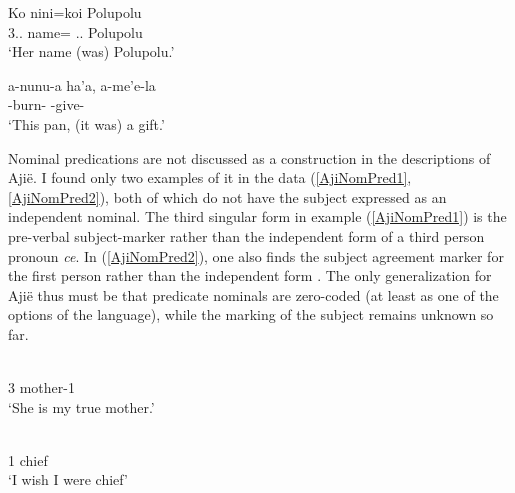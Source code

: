 \begin{exe}\ex\label{SavoNomPredZeroS}
\gll Ko nini=koi Polupolu\\
3\sg{}.\fem{}.\gen{} name=\emphat{} \deter{}.\sg{}.\fem{} Polupolu\\
\glt `Her name (was) Polupolu.'
\end{exe}


\begin{exe}
\ex\label{NiaNomPredZeroS}
\gll a-nunu-a ha'a, a-me'e-la\\
\ipfv{}-burn-\nmlz{} \prox{} \ipfv{}-give-\nmlz{}\\
\glt `This pan, (it was) a gift.'
\end{exe}

Nominal predications are not discussed as a construction in the descriptions of Aji\"e. 
I found only two examples of it in the data (\ref{AjiNomPred1}, \ref{AjiNomPred2}), both of which do not have the subject expressed as an independent nominal.
The third singular form in example (\ref{AjiNomPred1}) is the pre-verbal subject-marker rather than the independent form of a third person pronoun \emph{ce}. 
In (\ref{AjiNomPred2}), one also finds the subject agreement marker for the first person rather than the independent form \emph{}.
The only generalization for Aji\"e thus must be that predicate nominals are zero-coded (at least as one of the options of the language), while the marking of the subject remains unknown so far.  


\begin{exe}\ex\label{AjiNomPred1}
\gll {}  \\
3\sg{} \intens{} mother-1\sg{}\\
\glt `She is my true mother.'
\end{exe} 
 
\begin{exe}\ex\label{AjiNomPred2}\gll {\rm (}  \\
\Hyp{} 1\sg{} chief\\
\glt `I wish I were chief' 
\end{exe}


